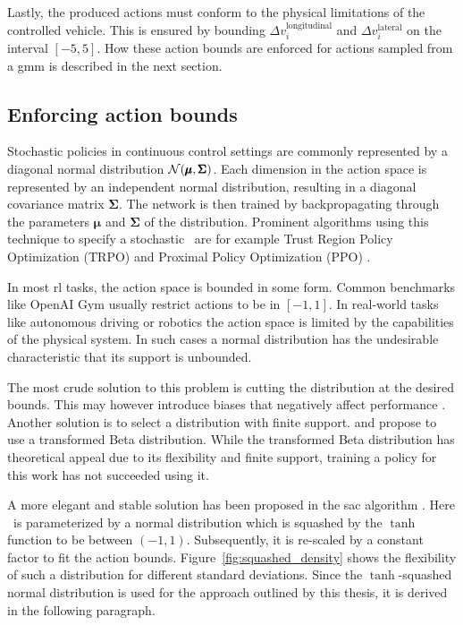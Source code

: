 Lastly, the produced actions must conform to the physical limitations of the controlled vehicle. This is ensured by bounding $\Delta v^{\text{longitudinal}}_i$ and $\Delta v^{\text{lateral}}_i$ on the interval $[-5, 5]$. How these action bounds are enforced for actions sampled from a \gls{gmm} is described in the next section.


\subsection{Enforcing action bounds}\label{ssec:action_bounds}
Stochastic policies in continuous control settings are commonly represented by a diagonal normal distribution $\mathcal{N}( \pmb \mu, \pmb \Sigma)$. Each dimension in the action space is represented by an independent normal distribution, resulting in a diagonal covariance matrix $\pmb \Sigma$. The network is then trained by backpropagating through the parameters $\pmb \mu$ and $\pmb \Sigma$ of the distribution. Prominent algorithms using this technique to specify a stochastic \p\ are for example Trust Region Policy Optimization (TRPO) \cite{schulmanTrustRegionPolicy2017} and Proximal Policy Optimization (PPO) \cite{schulmanProximalPolicyOptimization2017}.

In most \gls{rl} tasks, the action space is bounded in some form. Common benchmarks like OpenAI Gym \cite{brockmanOpenAIGym2016} usually restrict actions to be in $[-1, 1]$. In real-world tasks like autonomous driving or robotics the action space is limited by the capabilities of the physical system. In such cases a normal distribution has the undesirable characteristic that its support is unbounded.

The most crude solution to this problem is cutting the distribution at the desired bounds. This may however introduce biases that negatively affect performance \cite{chouImprovingStochasticPolicy}. Another solution is to select a distribution with finite support. \cite{chouImprovingStochasticPolicy} and \cite{moerlandA0CAlphaZero2018} propose to use a transformed Beta distribution. While the transformed Beta distribution has theoretical appeal due to its flexibility and finite support, training a policy for this work has not succeeded using it.

A more elegant and stable solution has been proposed in the \gls{sac} algorithm \cite{haarnojaSoftActorCriticAlgorithms2018}. Here \p\ is parameterized by a normal distribution which is squashed by the $\tanh$ function to be between $(-1, 1)$. Subsequently, it is re-scaled by a constant factor to fit the action bounds. Figure~\ref{fig:squashed_density} shows the flexibility of such a distribution for different standard deviations. Since the $\tanh$-squashed normal distribution is used for the approach outlined by this thesis, it is derived in the following paragraph.

